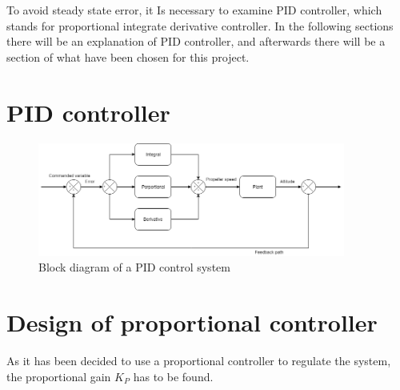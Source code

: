 To avoid steady state error, it Is necessary to examine PID controller, which stands for proportional integrate derivative controller. In the following sections there will be an explanation of PID controller, and afterwards there will be a section of what have been chosen for this project.  


\section{PID controller} %
\begin{figure}[H]
    \centering
    \includegraphics[width=0.9\textwidth]{figures/ch_design/PIDControl.png}
    \caption{Block diagram of a PID control system}
    \label{fig:PID_Controller}
\end{figure}

\section{Design of proportional controller}\label{sec:design_controller}
As it has been decided to use a proportional controller to regulate the system, the proportional gain $K_P$ has to be found. 
